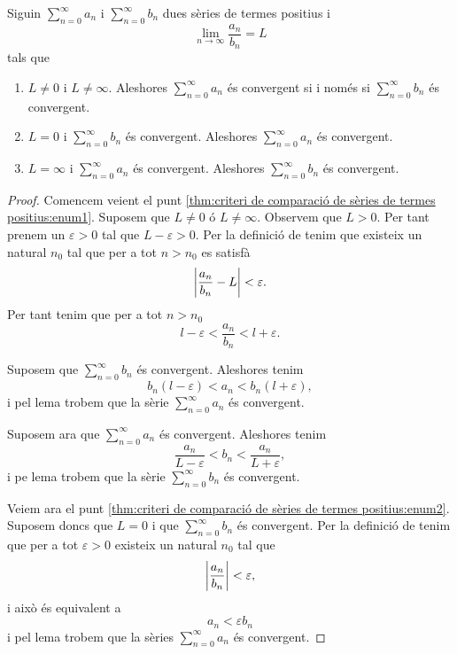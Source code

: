 \documentclass[../Apunts.tex]{subfiles}
\begin{document}
	\begin{theorem}
		\label{thm:criteri de comparació de sèries de termes positius}
		Siguin \(\sum_{n=0}^{\infty}a_{n}\) i \(\sum_{n=0}^{\infty}b_{n}\) dues sèries de termes positius i
		\[\lim_{n\to\infty}\frac{a_{n}}{b_{n}}=L\]
		tals que
		\begin{enumerate}
			\item\label{thm:criteri de comparació de sèries de termes positius:enum1} \(L\neq0\) i \(L\neq\infty\). Aleshores \(\sum_{n=0}^{\infty}a_{n}\) és convergent si i només si \(\sum_{n=0}^{\infty}b_{n}\) és convergent.
			\item\label{thm:criteri de comparació de sèries de termes positius:enum2} \(L=0\) i \(\sum_{n=0}^{\infty}b_{n}\) és convergent. Aleshores \(\sum_{n=0}^{\infty}a_{n}\) és convergent.
			\item\label{thm:criteri de comparació de sèries de termes positius:enum3} \(L=\infty\) i \(\sum_{n=0}^{\infty}a_{n}\) és convergent. Aleshores \(\sum_{n=0}^{\infty}b_{n}\) és convergent.
		\end{enumerate}
		\begin{proof}
			Comencem veient el punt \eqref{thm:criteri de comparació de sèries de termes positius:enum1}. Suposem que \(L\neq0\) ó \(L\neq\infty\). Observem que \(L>0\). Per tant prenem un \(\varepsilon>0\) tal que \(L-\varepsilon>0\). Per la definició de  tenim que existeix un natural \(n_{0}\) tal que per a tot \(n>n_{0}\) es satisfà
			\[\abs{\frac{a_{n}}{b_{n}}-L}<\varepsilon.\]
			Per tant tenim que per a tot \(n>n_{0}\)
			\[l-\varepsilon<\frac{a_{n}}{b_{n}}<l+\varepsilon.\]
			
			Suposem que \(\sum_{n=0}^{\infty}b_{n}\) és convergent. Aleshores tenim
			\[b_{n}(l-\varepsilon)<a_{n}<b_{n}(l+\varepsilon),\]
			i pel lema  trobem que la sèrie \(\sum_{n=0}^{\infty}a_{n}\) és convergent.
			
			Suposem ara que \(\sum_{n=0}^{\infty}a_{n}\) és convergent. Aleshores tenim
			\[\frac{a_{n}}{L-\varepsilon}<b_{n}<\frac{a_{n}}{L+\varepsilon},\]
			i pe lema  trobem que la sèrie \(\sum_{n=0}^{\infty}b_{n}\) és convergent.
			
			Veiem ara el punt \eqref{thm:criteri de comparació de sèries de termes positius:enum2}. Suposem doncs que \(L=0\) i que \(\sum_{n=0}^{\infty}b_{n}\) és convergent. Per la definició de  tenim que per a tot \(\varepsilon>0\) existeix un natural \(n_{0}\) tal que
			\[\abs{\frac{a_{n}}{b_{n}}}<\varepsilon,\]
			i això és equivalent a
			\[a_{n}<\varepsilon b_{n}\]
			i pel lema  trobem que la sèries \(\sum_{n=0}^{\infty}a_{n}\) és convergent.
			

\end{proof}
\end{theorem}
\end{document}
